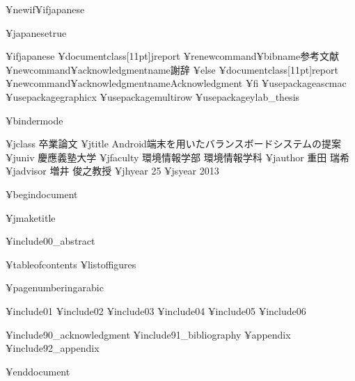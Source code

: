 




¥newif¥ifjapanese

¥japanesetrue	%

¥ifjapanese
	¥documentclass[11pt]{jreport}
	¥renewcommand{¥bibname}{参考文献}
	¥newcommand{¥acknowledgmentname}{謝辞}
¥else
	¥documentclass[11pt]{report}
	¥newcommand{¥acknowledgmentname}{Acknowledgment}
¥fi
¥usepackage{ascmac}
¥usepackage{graphicx}
¥usepackage{multirow}
¥usepackage{ylab_thesis}


¥bindermode	%

¥jclass	{卒業論文}							%
¥jtitle		{Android端末を用いたバランスボードシステムの提案}			%
¥juniv		{慶應義塾大学}						%
¥jfaculty	{環境情報学部 環境情報学科}				%
¥jauthor	{重田 瑞希}						%
¥jadvisor	{増井 俊之}{教授}					%
¥jhyear	{25}								%
¥jsyear	{2013}							%


¥begin{document}

¥jmaketitle		%

¥include{00_abstract}	%

¥tableofcontents	%
¥listoffigures		%

¥pagenumbering{arabic}

¥include{01}	%
¥include{02}	%
¥include{03}	%
¥include{04}	%
¥include{05}	%
¥include{06}	%

¥include{90_acknowledgment}	%
¥include{91_bibliography}	%
¥appendix
¥include{92_appendix}		%

¥end{document}

